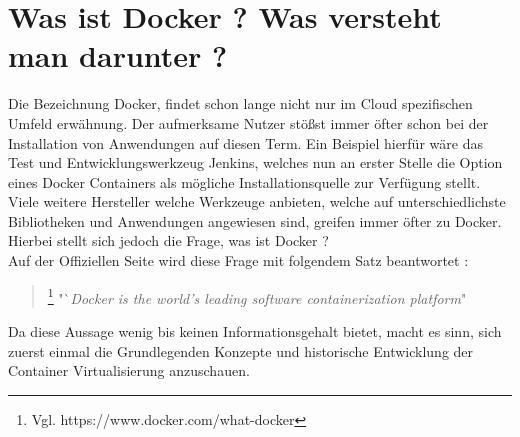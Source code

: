 \documentclass[12pt,toc=bib,toc=listof]{scrreprt}
\begin{document}
\section{Was ist Docker ? Was versteht man darunter ?}
Die Bezeichnung Docker, findet schon lange nicht nur im Cloud spezifischen Umfeld erwähnung.
Der aufmerksame Nutzer stößst immer öfter schon bei der Installation von Anwendungen auf diesen Term.
Ein Beispiel hierfür wäre das Test und Entwicklungswerkzeug Jenkins, welches nun an erster Stelle die Option eines Docker Containers als mögliche Installationsquelle zur Verfügung stellt. \cite{jenkins}
Viele weitere Hersteller welche Werkzeuge anbieten, welche auf unterschiedlichste Bibliotheken und Anwendungen angewiesen sind, greifen immer öfter zu Docker. 
Hierbei stellt sich jedoch die Frage, was ist Docker ? \\
Auf der Offiziellen Seite wird diese Frage mit folgendem Satz beantwortet :

\begin{quote}
	\footnote[1]{Vgl. https://www.docker.com/what-docker}
	"`\textit{Docker is the world's leading software containerization platform}"
\end{quote}
Da diese Aussage wenig bis keinen Informationsgehalt bietet, macht es sinn, sich zuerst einmal die Grundlegenden Konzepte und historische Entwicklung der Container Virtualisierung anzuschauen. 
\end{document}
